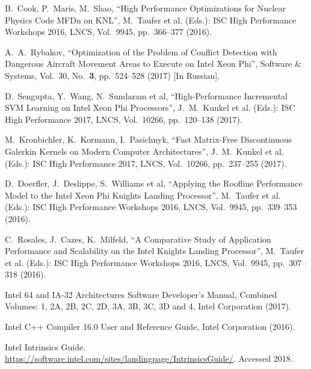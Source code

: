 \documentclass[
11pt,%
tightenlines,%
twoside,%
onecolumn,%
nofloats,%
nobibnotes,%
nofootinbib,%
superscriptaddress,%
noshowpacs,%
centertags]%
{revtex4}
\begin{document}
\begin{thebibliography}{99}
B.~Cook, P.~Maris, M.~Shao, \textquotedblleft High Performance Optimizations for Nuclear Physics Code MFDn on KNL\textquotedblright, M.~Taufer et al. (Eds.): ISC High Performance Workshops 2016, LNCS, Vol.~9945, pp.~366--377 (2016).

A.~A.~Rybakov, \textquotedblleft Optimization of the Problem of Conflict Detection with Dangerous Aircraft Movement Areas to Execute on Intel Xeon Phi\textquotedblright, Software \& Systems, Vol.~30, No.~\textbf{3}, pp.~524--528 (2017) [In Russian].

D.~Sengupta, Y.~Wang, N.~Sundaram et al, \textquotedblleft High-Performance Incremental SVM Learning on Intel Xeon Phi Processors\textquotedblright, J.~M.~Kunkel et al. (Eds.): ISC High Performance 2017, LNCS, Vol.~10266, pp.~120--138 (2017).

M.~Kronbichler, K.~Kormann, I.~Pasichnyk, \textquotedblleft Fast Matrix-Free Discontinuous Galerkin Kernels on Modern Computer Architectures\textquotedblright, J.~M.~Kunkel et al. (Eds.): ISC High Performance 2017, LNCS, Vol.~10266, pp.~237--255 (2017).

D.~Doerfler, J.~Deslippe, S.~Williams et al, \textquotedblleft Applying the Roofline Performance Model to the Intel Xeon Phi Knights Landing Processor\textquotedblright, M.~Taufer et al. (Eds.): ISC High Performance Workshops 2016, LNCS, Vol.~9945, pp.~339--353 (2016).

C.~Rosales, J.~Cazes, K.~Milfeld, \textquotedblleft A Comparative Study of Application Performance and Scalability on the Intel Knights Landing Processor\textquotedblright, M.~Taufer et al. (Eds.): ISC High Performance Workshops 2016, LNCS, Vol.~9945, pp.~307--318 (2016).


Intel 64 and IA-32 Architectures Software Developer's Manual, Combined Volumes: 1, 2A, 2B, 2C, 2D, 3A, 3B, 3C, 3D and 4, Intel Corporation (2017).

Intel C++ Compiler 16.0 User and Reference Guide, Intel Corporation (2016).

Intel Intrinsics Guide. \url{https://software.intel.com/sites/landingpage/IntrinsicsGuide/}. Accessed 2018.


\end{thebibliography}
\end{document}
